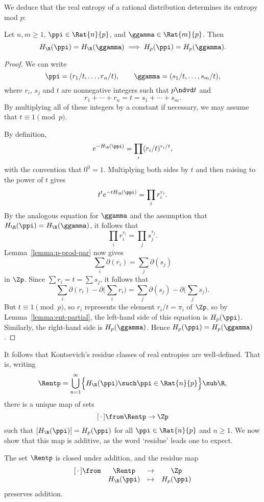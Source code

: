 We deduce that the real entropy of a rational distribution determines its
entropy mod $p$:

\begin{thm}
% 
Let $n, m \geq 1$, $\ppi \in \Rat{n}{p}$, and $\ggamma \in \Rat{m}{p}$.
Then
\[
H_\R(\ppi) = H_\R(\ggamma) \implies H_p(\ppi) = H_p(\ggamma).
\]
\end{thm}

\begin{proof}
We can write
\[
\ppi = (r_1/t, \ldots, r_n/t),  
\qquad
\ggamma = (s_1/t, \ldots, s_m/t),
\]
where $r_i$, $s_j$ and $t$ are nonnegative integers such that $p \ndvd t$
and
\[
r_1 + \cdots + r_n = t = s_1 + \cdots + s_m.
\]
By multiplying all of these integers by a constant if necessary, we may
assume that $t \equiv 1 \pmod{p}$.  

By definition,
\[
e^{-H_\R(\ppi)} = \prod_i (r_i/t)^{r_i/t},
\]
with the convention that $0^0 = 1$.  Multiplying both sides by $t$ and then
raising to the power of $t$ gives
\[
t^t e^{-t H_\R(\ppi)} = \prod_i r_i^{r_i}.
\]
By the analogous equation for $\ggamma$ and the assumption that $H_\R(\ppi)
= H_\R(\ggamma)$, it follows that
\[
\prod_i r_i^{r_i} = \prod_j s_j^{s_j}.
\]
Lemma~\ref{lemma:p-prod-par} now gives
\[
\sum_i \partial(r_i) = \sum_j \partial (s_j)
\]
in $\Zp$.  Since $\sum r_i = t = \sum s_j$, it follows that
\[
\sum_i \partial(r_i) - \partial \Biggl( \sum_i r_i \Biggr)
=
\sum_j \partial(s_j) - \partial \Biggl( \sum_j s_j \Biggr).
\]
But $t \equiv 1 \pmod{p}$, so $r_i$ represents the element $r_i/t = \pi_i$
of $\Zp$, so by Lemma~\ref{lemma:ent-partial}, the left-hand side of this
equation is $H_p(\ppi)$.  Similarly, the right-hand side is
$H_p(\ggamma)$. Hence $H_p(\ppi) = H_p(\ggamma)$.
\end{proof}


It follows that Kontsevich's residue classes of real entropies are
well-defined.  That is, writing
\[
\Rentp
=
\bigcup_{n = 1}^\infty
\Bigl\{ H_\R(\ppi) \such \ppi \in \Rat{n}{p} \Bigr\}
\sub \R,
\]
there is a unique map of sets
\[
[\,\cdot\,] \from \Rentp \to \Zp
\]
such that $[H_\R(\ppi)] = H_p(\ppi)$ for all $\ppi \in
\Rat{n}{p}$ and $n \geq 1$.  We now show that this map is additive, as the
word `residue' leads one to expect.

\begin{propn}
% 
The set $\Rentp$ is closed under addition, and the residue map
\[
\begin{array}{cccc}
{}[\,\cdot\,] \from     &     
\Rentp  &
\to     &
\Zp     \\
&
H_\R(\ppi)      &
\mapsto &
H_p(\ppi)
\end{array}
\]
preserves addition.
\end{propn}

